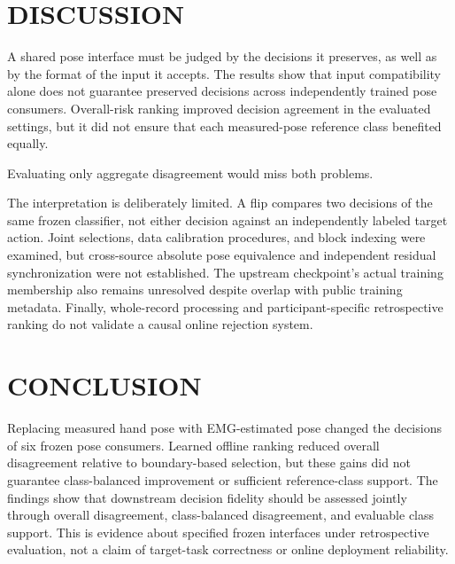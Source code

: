 \section{DISCUSSION}\label{discussion}
A shared pose interface must be judged by the decisions it preserves, as well as by the format of the input it accepts. The results show that input compatibility alone does not guarantee preserved decisions across independently trained pose consumers. Overall-risk ranking improved decision agreement in the evaluated settings, but it did not ensure that each measured-pose reference class benefited equally.

Evaluating only aggregate disagreement would miss both problems.

The interpretation is deliberately limited. A flip compares two decisions of the same frozen classifier, not either decision against an independently labeled target action. Joint selections, data calibration procedures, and block indexing were examined, but cross-source absolute pose equivalence and independent residual synchronization were not established. The upstream checkpoint's actual training membership also remains unresolved despite overlap with public training metadata. Finally, whole-record processing and participant-specific retrospective ranking do not validate a causal online rejection system.



\section{CONCLUSION}\label{conclusion}
Replacing measured hand pose with EMG-estimated pose changed the decisions of six frozen pose consumers. Learned offline ranking reduced overall disagreement relative to boundary-based selection, but these gains did not guarantee class-balanced improvement or sufficient reference-class support. The findings show that downstream decision fidelity should be assessed jointly through overall disagreement, class-balanced disagreement, and evaluable class support. This is evidence about specified frozen interfaces under retrospective evaluation, not a claim of target-task correctness or online deployment reliability.


